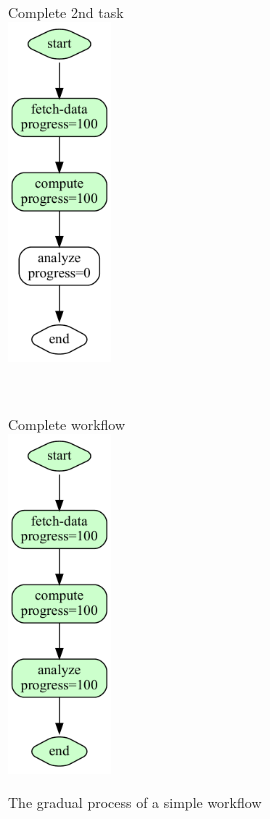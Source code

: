 \begin{figure}[htb]
{\begin{minipage}[b]{0.18\textwidth}
\end{minipage} \ \
\begin{minipage}[b]{0.18\textwidth}
Complete 2nd task \\
\includegraphics[height=9cm]{images/workflow-example-3.pdf}
\end{minipage} \ \
\begin{minipage}[b]{0.18\textwidth}
Complete workflow \\
\includegraphics[height=9cm]{images/workflow-example-5.pdf}
\end{minipage} 
}
\caption{The gradual process of a simple workflow}\label{fig:workflow-process}
\end{figure}


